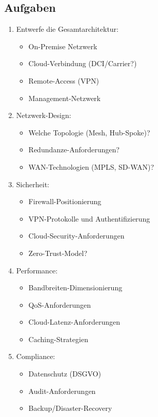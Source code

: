 \documentclass[12pt,a4paper,german]{report}
\begin{document}
\subsection{Aufgaben}
\begin{enumerate}
    \item Entwerfe die Gesamtarchitektur:
    \begin{itemize}
        \item On-Premise Netzwerk
        \item Cloud-Verbindung (DCI/Carrier?)
        \item Remote-Access (VPN)
        \item Management-Netzwerk
    \end{itemize}
    \item Netzwerk-Design:
    \begin{itemize}
        \item Welche Topologie (Mesh, Hub-Spoke)?
        \item Redundanze-Anforderungen?
        \item WAN-Technologien (MPLS, SD-WAN)?
    \end{itemize}
    \item Sicherheit:
    \begin{itemize}
        \item Firewall-Positionierung
        \item VPN-Protokolle und Authentifizierung
        \item Cloud-Security-Anforderungen
        \item Zero-Trust-Model?
    \end{itemize}
    \item Performance:
    \begin{itemize}
        \item Bandbreiten-Dimensionierung
        \item QoS-Anforderungen
        \item Cloud-Latenz-Anforderungen
        \item Caching-Strategien
    \end{itemize}
    \item Compliance:
    \begin{itemize}
        \item Datenschutz (DSGVO)
        \item Audit-Anforderungen
        \item Backup/Disaster-Recovery
    \end{itemize}
\end{enumerate}
\end{document}
